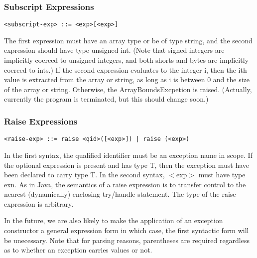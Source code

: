 \documentclass[titlepage,10pt]{article}
\begin{document}
\subsubsection{Subscript Expressions}


\begin{verbatim}
<subscript-exp> ::= <exp>[<exp>]
\end{verbatim}

The first expression must have an array type or be of type string, and
the second expression should have type unsigned int.  (Note that signed
integers are implicitly coerced to unsigned integers, and both shorts
and bytes are implicitly coerced to ints.)  If the second expression
evaluates to the integer i, then the ith value is extracted from the
array or string, as long as i is between 0 and the size of the array or
string.  Otherwise, the ArrayBoundsExcpetion is raised.  (Actually,
currently the program is terminated, but this should change soon.)

\subsubsection{Raise Expressions}


\begin{verbatim}
<raise-exp> ::= raise <qid>([<exp>]) | raise (<exp>)
\end{verbatim}

In the first syntax, the qualified identifier must be an exception name
in scope.  If the optional expression is present and has type T, then
the exception must have been declared to carry type T.  In the second
syntax, $<$exp$>$ must have type exn.  As in Java, the semantics of a
raise expression is to transfer control to the nearest (dynamically)
enclosing try/handle statement.  The type of the raise expression is
arbitrary.

In the future,  we are also likely to make the application of an
exception constructor a general expression form in which case, the first
syntactic form will be unecessary.  Note that for parsing reasons,
parentheses are required regardless as to whether an exception carries
values or not.
\end{document}
